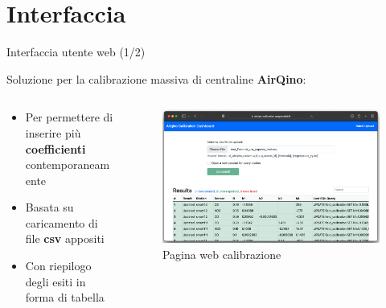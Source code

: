 \section{Interfaccia}
\begin{frame}{Interfaccia utente web (1/2)}

\vspace{-0.2cm}
\begin{center}
Soluzione per la calibrazione massiva di centraline \textbf{AirQino}:  
\end{center}

\vspace{-0.2cm}
\begin{columns}

\begin{column}{0.43\textwidth}
\vspace{-.6cm}
\begin{itemize}
  \item Per permettere di inserire più \textbf{coefficienti} contemporaneamente
  \item Basata su caricamento di file \textbf{csv} appositi
  \item Con riepilogo degli esiti in forma di tabella
\end{itemize}

\end{column}

\begin{column}{0.65\textwidth}

\begin{center}
\begin{figure}[H]
\centering
\captionsetup{justification=centering}
\vspace{-0.2cm}
\includegraphics[width=\textwidth]{images/interfaccia_2_r}
\caption{Pagina web calibrazione}
\end{figure}
\end{center}

\end{column}

\end{columns}
\end{frame}

